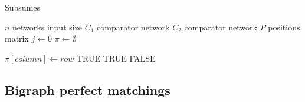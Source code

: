 \documentclass[../main.tex]{subfiles}
\begin{document}
	
	\begin{algorithm}[H]
		\caption {Subsumes}
		\begin{algorithmic}
			\State $n$ networks input size
			\State $C_1$ comparator network
			\State $C_2$ comparator network
			\State $P$ positions matrix
			\State $j \leftarrow 0$
			\State $\pi \leftarrow \emptyset $ 
			
			\State $\pi[column] \leftarrow row $
			\Return TRUE
			\EndIf
			\EndIf
			\EndFor
			\Return TRUE
			\Else {}
			\Return FALSE
			\EndIf
			\EndProcedure
		\end{algorithmic}
	\end{algorithm}
	\subsection{Bigraph perfect matchings}
\end{document}
